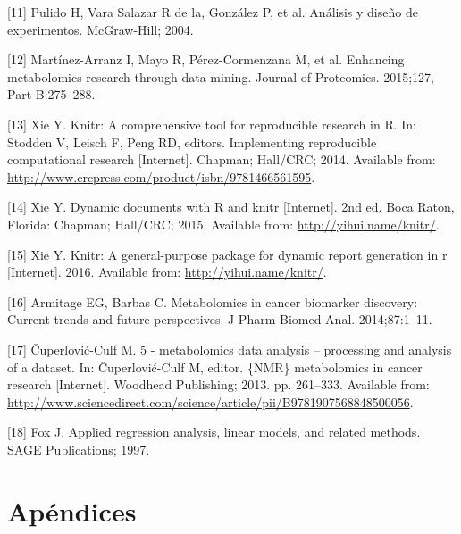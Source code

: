 \documentclass[12pt,spanish,a4paper]{article}
\numberwithin{equation}{section}
\begin{document}
\hypertarget{ref-pulido2004}{}
{[}11{]} Pulido H, Vara Salazar R de la, González P, et al. Análisis y
diseño de experimentos. McGraw-Hill; 2004.

\hypertarget{ref-martinezarranz2015}{}
{[}12{]} Martínez-Arranz I, Mayo R, Pérez-Cormenzana M, et al. Enhancing
metabolomics research through data mining. Journal of Proteomics.
2015;127, Part B:275--288.

\hypertarget{ref-xie2014}{}
{[}13{]} Xie Y. Knitr: A comprehensive tool for reproducible research in
R. In: Stodden V, Leisch F, Peng RD, editors. Implementing reproducible
computational research {[}Internet{]}. Chapman; Hall/CRC; 2014.
Available from:
\url{http://www.crcpress.com/product/isbn/9781466561595}.

\hypertarget{ref-xie2015}{}
{[}14{]} Xie Y. Dynamic documents with R and knitr {[}Internet{]}. 2nd
ed. Boca Raton, Florida: Chapman; Hall/CRC; 2015. Available from:
\url{http://yihui.name/knitr/}.

\hypertarget{ref-xie2016package}{}
{[}15{]} Xie Y. Knitr: A general-purpose package for dynamic report
generation in r {[}Internet{]}. 2016. Available from:
\url{http://yihui.name/knitr/}.

\hypertarget{ref-armitage2014}{}
{[}16{]} Armitage EG, Barbas C. Metabolomics in cancer biomarker
discovery: Current trends and future perspectives. J Pharm Biomed Anal.
2014;87:1--11.

\hypertarget{ref-miroslava2013}{}
{[}17{]} Čuperlović-Culf M. 5 - metabolomics data analysis -- processing
and analysis of a dataset. In: Čuperlović-Culf M, editor. \{NMR\}
metabolomics in cancer research {[}Internet{]}. Woodhead Publishing;
2013. pp. 261--333. Available from:
\url{http://www.sciencedirect.com/science/article/pii/B9781907568848500056}.

\hypertarget{ref-fox1997}{}
{[}18{]} Fox J. Applied regression analysis, linear models, and related
methods. SAGE Publications; 1997.

% 
%

\clearpage

\section{Apéndices}


\end{document}
